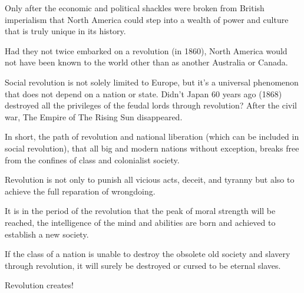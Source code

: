 Only after the economic and political shackles were broken from British imperialism that North America could step into 
a wealth of power and culture that is truly unique in its history.\nline

Had they not twice embarked on a revolution (in 1860), North America would not have been known to the 
world other than as another Australia or Canada.\nline

Social revolution is not solely limited to Europe, but it's a universal phenomenon that does not depend 
on a nation or state. Didn't Japan 60 years ago (1868) destroyed all the privileges of the feudal lords 
through revolution? After the civil war, The Empire of The Rising Sun disappeared.\nline

In short, the path of revolution and national liberation (which can be included in social revolution), 
that all big and modern nations without exception, breaks free from the confines of class and colonialist society.\nline

Revolution is not only to punish all vicious acts, deceit, and tyranny but also to achieve the full reparation of wrongdoing.\nline

It is in the period of the revolution that the peak of moral strength will be reached, the intelligence of the mind 
and abilities are born and achieved to establish a new society.\nline

If the class of a nation is unable to destroy the obsolete old society and slavery through revolution, 
it will surely be destroyed or cursed to be eternal slaves.\nline

Revolution creates!